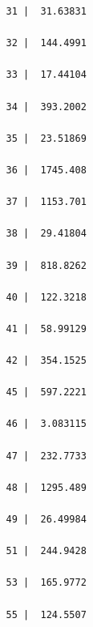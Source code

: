 \documentclass[
]{book}
\begin{document}
\begin{verbatim}
          31 |  31.63831 

          32 |  144.4991 

          33 |  17.44104 

          34 |  393.2002 

          35 |  23.51869 

          36 |  1745.408 

          37 |  1153.701 

          38 |  29.41804 

          39 |  818.8262 

          40 |  122.3218 

          41 |  58.99129 

          42 |  354.1525 

          45 |  597.2221 

          46 |  3.083115 

          47 |  232.7733 

          48 |  1295.489 

          49 |  26.49984 

          51 |  244.9428 

          53 |  165.9772 

          55 |  124.5507 


\end{verbatim}
\end{document}
